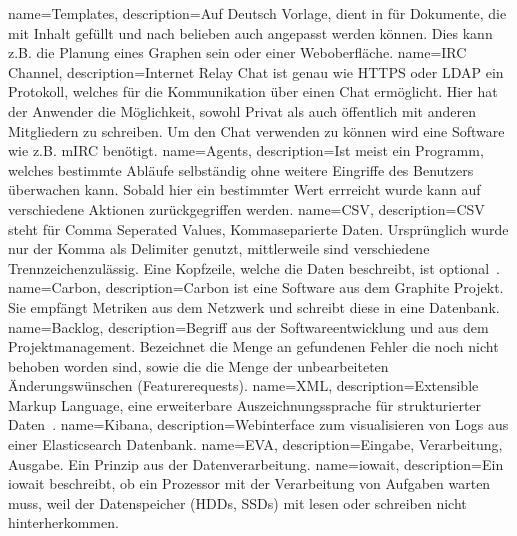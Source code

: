 {
  name=Templates,
  description={Auf Deutsch Vorlage, dient in für Dokumente, die mit Inhalt gefüllt
              und nach belieben auch angepasst werden können. Dies kann z.B. die
              Planung eines Graphen sein oder einer Weboberfläche.}
}
{
  name=IRC Channel,
  description={Internet Relay Chat ist genau wie \gls{HTTPS} oder \gls{LDAP}
              ein Protokoll, welches für die Kommunikation über einen Chat
              ermöglicht. Hier hat der Anwender die Möglichkeit, sowohl
              Privat als auch öffentlich mit anderen Mitgliedern zu schreiben.
              Um den Chat verwenden zu können wird eine Software wie z.B.
              mIRC benötigt.}
}
{
  name=Agents,
  description={Ist meist ein Programm, welches bestimmte Abläufe selbständig
              ohne weitere Eingriffe des Benutzers überwachen kann. Sobald
              hier ein bestimmter Wert errreicht wurde kann auf
              verschiedene Aktionen zurückgegriffen werden.}
}
{
  name=CSV,
  description={CSV steht für Comma Seperated Values, Kommaseparierte Daten.
              Ursprünglich wurde nur der Komma als Delimiter genutzt,
              mittlerweile sind verschiedene Trennzeichenzulässig. Eine
              Kopfzeile, welche die Daten beschreibt, ist optional~\cite{RFC4180}.}
}
{
  name=Carbon,
  description={Carbon ist eine Software aus dem Graphite Projekt. Sie empfängt
               Metriken aus dem Netzwerk und schreibt diese in eine Datenbank.}
}
{
  name=Backlog,
  description={Begriff aus der Softwareentwicklung und aus dem Projektmanagement.
               Bezeichnet die Menge an gefundenen Fehler die noch nicht behoben
               worden sind, sowie die die Menge der unbearbeiteten
               Änderungswünschen (Featurerequests).}
}
{
  name=XML,
  description={Extensible Markup Language, eine erweiterbare Auszeichnungssprache
               für strukturierter Daten~\cite{xml_definition}.}
}
{
  name=Kibana,
  description={Webinterface zum visualisieren von Logs aus einer Elasticsearch
               Datenbank.}
}
{
  name=EVA,
  description={Eingabe, Verarbeitung, Ausgabe. Ein Prinzip aus der Datenverarbeitung.}
}
{
  name=iowait,
  description={Ein iowait beschreibt, ob ein Prozessor mit der Verarbeitung von
              Aufgaben warten muss, weil der Datenspeicher (HDDs, SSDs) mit lesen
              oder schreiben nicht hinterherkommen.}
}
